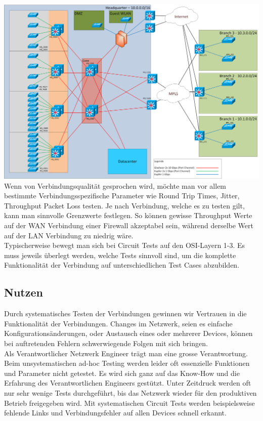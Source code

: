 \documentclass[a4,12pt]{scrartcl}
\begin{document}
\includegraphics[width=1\textwidth]{figures/Netzwerk_physisch.png}\\

\noindent Wenn von Verbindungsqualität gesprochen wird, möchte man vor allem bestimmte Verbindungsspezifische Parameter wie Round Trip Times, Jitter, Throughput Packet Loss testen. Je nach Verbindung, welche es zu testen gilt, kann man sinnvolle Grenzwerte festlegen. So können gewisse Throughput Werte auf der WAN Verbindung einer Firewall akzeptabel sein, während derselbe Wert auf der LAN Verbindung zu niedrig wäre.\\

\noindent Typischerweise bewegt man sich bei Circuit Tests auf den OSI-Layern 1-3. Es muss jeweils überlegt werden, welche Tests sinnvoll sind, um die komplette Funktionalität der Verbindung auf unterschiedlichen Test Cases abzubilden.   
\subsection{Nutzen}
Durch systematisches Testen der Verbindungen gewinnen wir Vertrauen in die Funktionalität der Verbindungen. Changes im Netzwerk, seien es einfache Konfigurationsänderungen, oder Austausch eines oder mehrerer Devices, können bei auftretenden Fehlern schwerwiegende Folgen mit sich bringen.\\

\noindent Als Verantwortlicher Netzwerk Engineer trägt man eine grosse Verantwortung. Beim unsystematischen ad-hoc Testing werden leider oft essenzielle Funktionen und Parameter nicht getestet. Es wird sich ganz auf das Know-How und die Erfahrung des Verantwortlichen Engineers gestützt. Unter Zeitdruck werden oft nur sehr wenige Tests durchgeführt, bis das Netzwerk wieder für den produktiven Betrieb freigegeben wird. Mit systematischen Circuit Tests werden beispielsweise fehlende Links und Verbindungsfehler auf allen Devices schnell erkannt. 
\end{document}
